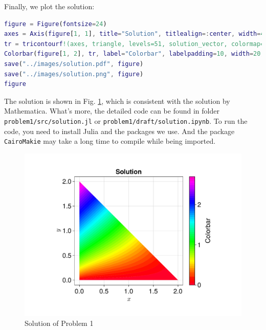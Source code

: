 Finally, we plot the solution:
\begin{lstlisting}[language=matlab]
figure = Figure(fontsize=24)
axes = Axis(figure[1, 1], title="Solution", titlealign=:center, width=400, height=400, xlabel=L"$x$", ylabel=L"$y$")
tr = tricontourf!(axes, triangle, levels=51, solution_vector, colormap=:gist_rainbow)
Colorbar(figure[1, 2], tr, label="Colorbar", labelpadding=10, width=20, height=400)
save("../images/solution.pdf", figure)
save("../images/solution.png", figure)
figure
\end{lstlisting}

The solution is shown in Fig. \ref{fig:solution},
which is consistent with the solution by Mathematica.
What's more, 
the detailed code can be found in folder \verb|problem1/src/solution.jl| or 
\verb|problem1/draft/solution.ipynb|.
To run the code,
you need to install Julia and the packages we use.
And the package \verb|CairoMakie| may take a long time to compile while being imported.
\begin{figure}[H]
    \centering
    \includegraphics[width=\textwidth]{../problem1/images/solution.pdf}
    \caption{Solution of Problem 1}
    \label{fig:solution}
\end{figure}